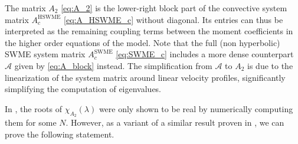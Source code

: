 \documentclass[a4paper, 11pt]{article}
\begin{document}
The matrix $A_2$ \eqref{eq:A_2} is the lower-right block part of the convective system matrix $A^{\textrm{HSWME}}_{c}$ \eqref{eq:A_HSWME_c} without diagonal. Its entries can thus be interpreted as the remaining coupling terms between the moment coefficients in the higher order equations of the model. Note that the full (non hyperbolic) SWME system matrix $A^{\textrm{SWME}}_{c}$ \eqref{eq:SWME_c} includes a more dense counterpart $\mathcal{A}$ given by \eqref{eq:A_block} instead. The simplification from $\mathcal{A}$ to $A_2$ is due to the linearization of the system matrix around linear velocity profiles, significantly simplifying the computation of eigenvalues.

In \cite{Koellermeier2020c}, the roots of $\chi_{A_2}(\lambda)$ were only shown to be real by numerically computing them for some $N$. However, as a variant of a similar result proven in \cite{Bauerle2025}, we can prove the following statement.
\end{document}
